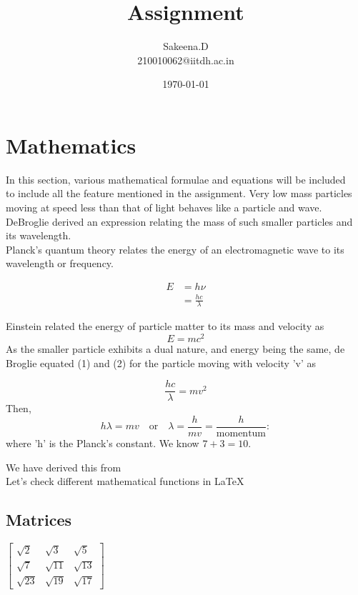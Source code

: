 \documentclass{article}
\title{Assignment}
\author{{Sakeena.D} \\
{210010062@iitdh.ac.in } }
\date{\today}
\begin{document}
\maketitle
\newpage
\tableofcontents
\listoffigures
\listoftables
\section{Mathematics}
In this section, various mathematical formulae and equations will be included\\
to include all the feature mentioned in the assignment. Very low mass particles\\
moving at speed less than that of light behaves like a particle and wave.\\
DeBroglie derived an expression relating the mass of such smaller particles and its
wavelength.\\
   Planck's quantum theory relates the energy of an electromagnetic wave to its wavelength or frequency.
       
\begin{equation}
\begin{split}
E &= h\nu \\
&= \frac{hc}{\lambda}
\end{split}
\end{equation}

Einstein related the energy of particle matter to its mass and velocity as
\begin{equation}
E = mc^2    
\end{equation}
As the smaller particle exhibits a dual nature, and energy being the same, de Broglie equated (1) and (2) for the particle moving with velocity 'v' as

\begin{equation*}
\frac{hc}{\lambda} = mv^2
\end{equation*}
Then,\begin{equation*} 
h\lambda = mv \quad \text{or} \quad \lambda = \frac{h}{mv} = \frac{h}{\text{momentum}}:
\end{equation*}where 'h' is the Planck’s constant. We know \(7 + 3 = 10\).

We have derived this from \cite{1}\\
Let's check different mathematical functions in \LaTeX

\subsection{Matrices}
\begin{flushleft}
 $\begin{bmatrix}
 \sqrt{2} & \sqrt{3} & \sqrt{5} \\
\sqrt{7} & \sqrt{11} & \sqrt{13} \\
\sqrt{23} & \sqrt{19} & \sqrt{17}
\end{bmatrix}
$
\end{flushleft}
\end{document}
